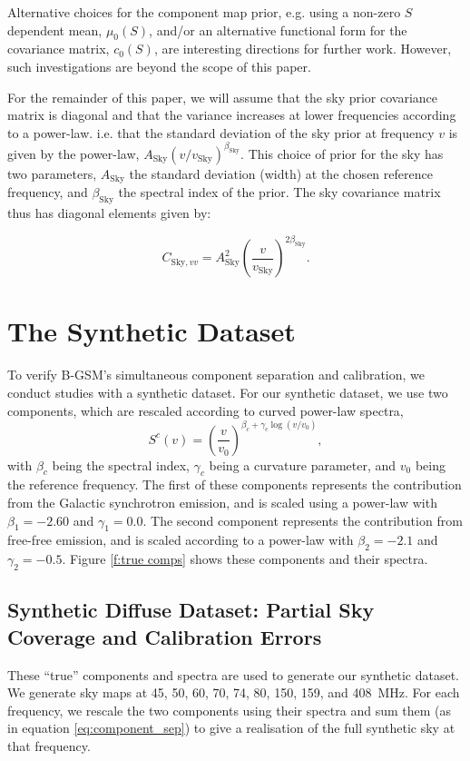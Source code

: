 \documentclass[fleqn,usenatbib]{mnras}
\begin{document}
Alternative choices for the component map prior, e.g. using a non-zero $S$ dependent mean, $\mu_0(S)$, and/or an alternative functional form for the covariance matrix, $c_0(S)$, are interesting directions for further work. However, such investigations are beyond the scope of this paper. 

For the remainder of this paper, we will assume that the sky prior covariance matrix is diagonal and that the variance increases at lower frequencies according to a power-law. i.e. that the standard deviation of the sky prior at frequency $v$ is given by the power-law, $A_\mathrm{Sky}\left(v/v_\mathrm{Sky}\right)^{\beta_\mathrm{Sky}}$. This choice of prior for the sky has two parameters, $A_\mathrm{Sky}$ the standard deviation (width) at the chosen reference frequency, and $\beta_\mathrm{Sky}$ the spectral index of the prior. The sky covariance matrix thus has diagonal elements given by:

\begin{equation}
    C_{\mathrm{Sky},{vv}} = A_\mathrm{Sky}^2\left(\frac{v}{v_\mathrm{Sky}}\right)^{2\beta_\mathrm{Sky}}.
\end{equation}

\section{The Synthetic Dataset}
To verify B-GSM's simultaneous component separation and calibration, we conduct studies with a synthetic dataset. For our synthetic dataset, we use two components, which are rescaled according to curved power-law spectra,
\begin{equation}\label{curved powerlaw}
    S^c(v) = \left(\frac{v}{v_0}\right)^{\beta_c + \gamma_c\log\left(v/v_0\right)},
\end{equation}
with $\beta_c$ being the spectral index, $\gamma_c$ being a curvature parameter, and $v_0$ being the reference frequency. The first of these components represents the contribution from the Galactic synchrotron emission, and is scaled using a power-law with $\beta_1=-2.60$ and $\gamma_1=0.0$. The second component represents the contribution from free-free emission, and is scaled according to a power-law with $\beta_2=-2.1$ and $\gamma_2=-0.5$. Figure \ref{f:true comps} shows these components and their spectra.



\subsection{Synthetic Diffuse Dataset: Partial Sky Coverage and Calibration Errors}
These ``true'' components and spectra are used to generate our synthetic dataset. We generate sky maps at  45, 50, 60, 70, 74, 80, 150, 159, and 408~MHz. For each frequency, we rescale the two components using their spectra and sum them (as in equation \ref{eq:component_sep}) to give a realisation of the full synthetic sky at that frequency. 
\end{document}
